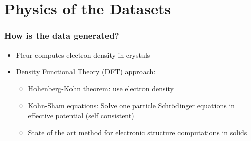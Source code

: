
\section{Physics of the Datasets}


\begin{frame}\frametitle{How is the data generated?}
\begin{itemize}

\item Fleur computes electron density in crystals
\item Density Functional Theory (DFT) approach:
\begin{itemize}
    \item Hohenberg-Kohn theorem: use electron density 
    \item Kohn-Sham equations: Solve one particle Schr\"odinger equations in effective potential (self consistent)
    \item State of the art method for electronic structure computations in solids
\end{itemize}
\end{itemize}
\end{frame}

